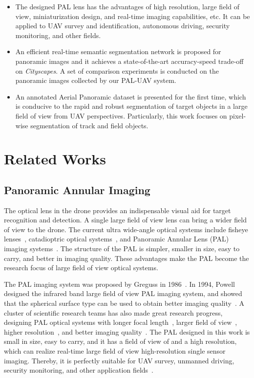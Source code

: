 \documentclass[letterpaper, 10 pt, conference]{ieeeconf}
\begin{document}
\begin{itemize}

\item The designed PAL lens has the advantages of  high resolution, large field of view, miniaturization design, and real-time imaging capabilities, etc. It can be applied to UAV survey and identification, autonomous driving, security monitoring, and other fields.
\item An efficient real-time semantic segmentation network is proposed for panoramic images and it achieves a state-of-the-art accuracy-speed trade-off on \emph{Cityscapes}. A set of comparison experiments is conducted on the panoramic images collected by our PAL-UAV system. 
\item An annotated Aerial Panoramic dataset is presented for the first time, which is conducive to the rapid and robust segmentation of target objects in a large field of view from UAV perspectives. Particularly, this work focuses on pixel-wise segmentation of track and field objects.
\end{itemize}
\section{Related Works}

\subsection{Panoramic Annular Imaging}

The optical lens in the drone provides an indispensable visual aid for target recognition and detection. A single large field of view lens can bring a wider field of view to the drone.
The current ultra wide-angle optical systems include fisheye lenses~\cite{fisheye}, catadioptric optical systems~\cite{catadioptric}, and Panoramic Annular Lens (PAL) imaging systems~\cite{panoramic_lens}.
The structure of the PAL is simpler, smaller in size, easy to carry, and better in imaging quality. These advantages make the PAL become the research focus of large field of view optical systems.

The PAL imaging system was proposed by Greguss in 1986~\cite{greguss1986panoramic}. In 1994, Powell designed the infrared band large field of view PAL imaging system, and showed that the spherical surface type can be used to obtain better imaging quality~\cite{powell}.
A cluster of scientific research teams has also made great research progress, designing PAL optical systems with longer focal length~\cite{niu}, larger field of view~\cite{large_field_of_view}, higher resolution~\cite{wang2019design}, and better imaging quality~\cite{high-perfoemance}.
The PAL designed in this work is small in size, easy to carry, and it has a field of view of 
and a  high resolution, which can realize real-time large field of view high-resolution single sensor imaging. Thereby, it is perfectly suitable for UAV survey, unmanned driving, security monitoring, and other application fields~\cite{fang2020cfvl,chen2021panoramic}.
\end{document}
